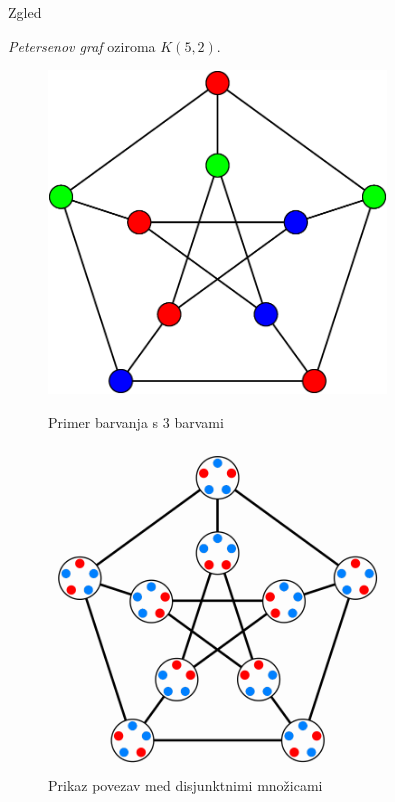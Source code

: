 \documentclass{beamer}
\begin{document}
\begin{frame}{Zgled}

{\em Petersenov graf} oziroma $K(5,2)$.

\begin{figure}[h!]
	\centering
	\begin{minipage}{0.45\textwidth}
		\centering
		\includegraphics[width=0.8\textwidth]{petersenov_graf_barvanje} %
        	\caption{Primer barvanja s $3$ barvami}
    	\end{minipage}\hfill
    	\begin{minipage}{0.45\textwidth}
       	 \centering
        	 \includegraphics[width=0.8\textwidth]{petersenov_graf_mnozice} %
       	 \caption{Prikaz povezav med disjunktnimi množicami}
    	\end{minipage}
\end{figure}

\end{frame}
\end{document}
